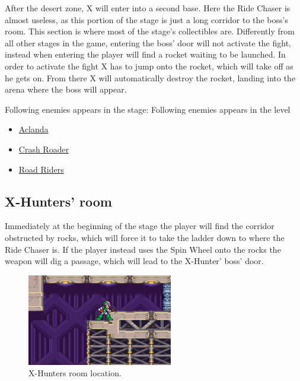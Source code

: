 After the desert zone, X will enter into a second base. Here the Ride Chaser is almost useless, as this portion of the stage is just a long corridor to the boss's room. This section is  where most of the stage's collectibles are. Differently from all other stages in the game, entering the boss' door will not activate the fight, instead when entering the player will find a rocket waiting to be launched. In order to activate the fight X has to jump onto the rocket, which will take off as he gets on. From there X will automatically destroy the rocket, landing into the arena where the boss will appear.

Following enemies appears in the stage:
Following enemies appears in the level~\cite{wiki:Desert_base}
\begin{itemize}
	\item \hyperlink{enem:Aclanda}{Aclanda}
	\item \hyperlink{enem:Crash_Roader}{Crash Roader}
	\item \hyperlink{enem:Road_Riders}{Road Riders}
\end{itemize}

\subsection{X-Hunters' room}
Immediately at the beginning of the stage the player will find the corridor obstructed by rocks, which will force it to take the ladder down to where the Ride Chaser is. If the player instead uses the Spin Wheel onto the rocks the weapon will dig a passage, which will lead to the X-Hunter' boss' door.

\begin{figure}[htp]
	\centering
	\includegraphics[height=4cm]{figures/X2/Overdrive_ostrich/Ostrich_Hunter_room.png}
	\caption{X-Hunters room location.}
\end{figure}

